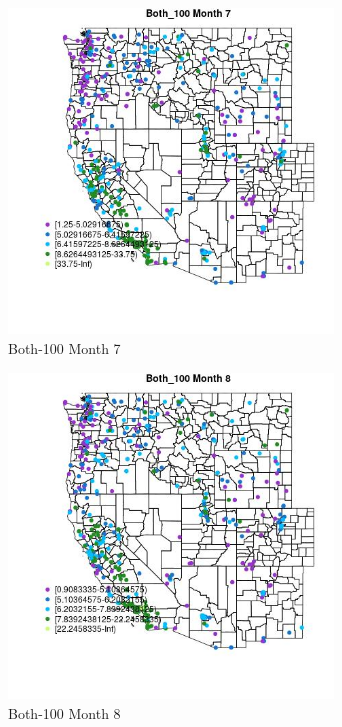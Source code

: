 \begin{figure} 
\centering  
\includegraphics[width=0.77\textwidth]{Code_Outputs/ML_input_report_ML_input_PM25_Step5_part_d_de_duplicated_aves_ML_input_MapObsMo7Both_100.jpg} 
\caption{\label{fig:ML_input_report_ML_input_PM25_Step5_part_d_de_duplicated_aves_ML_inputMapObsMo7Both_100}Both-100 Month 7} 
\end{figure} 
 

\begin{figure} 
\centering  
\includegraphics[width=0.77\textwidth]{Code_Outputs/ML_input_report_ML_input_PM25_Step5_part_d_de_duplicated_aves_ML_input_MapObsMo8Both_100.jpg} 
\caption{\label{fig:ML_input_report_ML_input_PM25_Step5_part_d_de_duplicated_aves_ML_inputMapObsMo8Both_100}Both-100 Month 8} 
\end{figure} 
 

